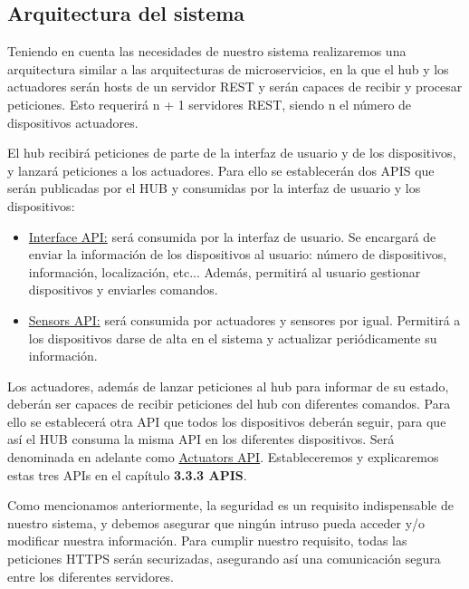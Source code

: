 \subsection{Arquitectura del sistema}
Teniendo en cuenta las necesidades de nuestro sistema realizaremos una arquitectura similar a las arquitecturas de microservicios,
en la que el hub y los actuadores serán hosts de un servidor REST y serán capaces de recibir y procesar peticiones.
Esto requerirá n + 1 servidores REST, siendo n el número de dispositivos actuadores.
\par
El hub recibirá peticiones de parte de la interfaz de usuario y de los dispositivos, y lanzará peticiones a los actuadores.
Para ello se establecerán dos APIS que serán publicadas por el HUB y consumidas por la interfaz de usuario y los dispositivos:
\begin{itemize}
\item \underline{Interface API:} será consumida por la interfaz de usuario. Se encargará de enviar la información de los dispositivos al usuario: número
 de dispositivos, información, localización, etc... Además, permitirá al usuario gestionar dispositivos y enviarles comandos.
\item \underline{Sensors API:} será consumida por actuadores y sensores por igual. Permitirá a los dispositivos darse de alta en el sistema y actualizar
periódicamente su información.
\end{itemize}
\par
Los actuadores, además de lanzar peticiones al hub para informar de su estado, deberán ser capaces de recibir peticiones del hub con
diferentes comandos. Para ello se establecerá otra API que todos los dispositivos deberán seguir, para que así el HUB consuma la misma API
en los diferentes dispositivos. Será denominada en adelante como \underline{Actuators API}. Estableceremos y explicaremos estas tres APIs en el capítulo
\textbf{3.3.3 APIS}.
\par
Como mencionamos anteriormente, la seguridad es un requisito indispensable de nuestro sistema, y debemos asegurar que ningún intruso pueda acceder y/o modificar nuestra información.
Para cumplir nuestro requisito, todas las peticiones HTTPS serán securizadas, asegurando así una comunicación segura entre los diferentes servidores.

